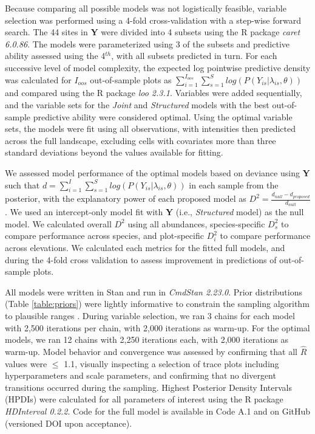 \documentclass[preprint,final,times,12pt,3p]{elsarticle}
\begin{document}
Because comparing all possible models was not logistically feasible, variable selection was performed using a 4-fold cross-validation with a step-wise forward search. The 44 sites in \textbf{Y} were divided into 4 subsets using the R package \emph{caret 6.0.86}. The models were parameterized using 3 of the subsets and predictive ability assessed using the 4$^{th}$, with all subsets predicted in turn. For each successive level of model complexity, the expected log pointwise predictive density was calculated for $I_{oos}$ out-of-sample plots as $\sum_{i=1}^{I_{oos}}\sum_{s=1}^S log(P(Y_{is} | \lambda_{is}, \theta))$ and compared using the R package \emph{loo 2.3.1}. Variables were added sequentially, and the variable sets for the \emph{Joint} and \emph{Structured} models with the best out-of-sample predictive ability were considered optimal. Using the optimal variable sets, the models were fit using all observations, with intensities then predicted across the full landscape, excluding cells with covariates more than three standard deviations beyond the values available for fitting.

We assessed model performance of the optimal models based on deviance using \textbf{Y} such that $d = \sum_{i=1}^{I}\sum_{s=1}^S log(P(Y_{is} | \lambda_{is}, \theta))$ in each sample from the posterior, with the explanatory power of each proposed model as $D^2 = \frac{d_{null} - d_{proposed}}{d_{null}}$ \citep{Caradima2019,Guisan2000}. We used an intercept-only model fit with \textbf{Y} (i.e., \emph{Structured} model) as the null model. We calculated overall $D^2$ using all abundances, species-specific $D^2_s$ to compare performance across species, and plot-specific $D^2_i$ to compare performance across elevations. We calculated each metrics for the fitted full models, and during the 4-fold cross validation to assess improvement in predictions of out-of-sample plots.

All models were written in Stan \citep{Carpenter2017} and run in \emph{CmdStan 2.23.0}. Prior distributions (Table \ref{table:priors}) were lightly informative to constrain the sampling algorithm to plausible ranges \citep{Carpenter2017,Lemoine2019}. During variable selection, we ran 3 chains for each model with 2,500 iterations per chain, with 2,000 iterations as warm-up. For the optimal models, we ran 12 chains with 2,250 iterations each, with 2,000 iterations as warm-up. Model behavior and convergence was assessed by confirming that all $\hat{R}$ values were $\leq$ 1.1, visually inspecting a selection of trace plots including hyperparameters and scale parameters, and confirming that no divergent transitions occurred during the sampling. Highest Posterior Density Intervals (HPDIs) were calculated for all parameters of interest using the R package \emph{HDInterval 0.2.2}. Code for the full model is available in Code A.1 and on GitHub (versioned DOI upon acceptance).
\end{document}
